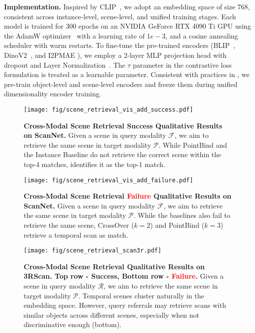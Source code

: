\noindent \textbf{Implementation.} Inspired by CLIP~\cite{Radford2021LearningTV}, we adopt an embedding space of size $768$, consistent across instance-level, scene-level, and unified training stages. Each model is trained for 300 epochs on an NVIDIA GeForce RTX 4090 Ti GPU using the AdamW optimizer~\cite{Loshchilov2017DecoupledWD} with a learning rate of $1e-3$, and a cosine annealing scheduler with warm restarts. To fine-tune the pre-trained encoders (BLIP~\cite{Li2022BLIPBL}, DinoV2~\cite{oquab2023dinov2, darcet2023vitneedreg}, and I2PMAE \cite{Zhang2022Learning3R}), we employ a 2-layer MLP projection head with dropout and Layer Normalization~\cite{miao2024scenegraphloc, girdhar2023imagebind}. The $\tau$ parameter in the contrastive loss formulation is treated as a learnable parameter. Consistent with practices in \cite{jia2024sceneverse}, we pre-train object-level and scene-level encoders and freeze them during unified dimensionality encoder training. 

\begin{figure*}
    \centering
    \texttt{[image: fig/scene\_retrieval\_vis\_add\_success.pdf]}
    \caption{\textbf{Cross-Modal Scene Retrieval \textcolor{spidergreen}{Success} Qualitative Results on ScanNet.} Given a scene in query modality $\mathcal{F}$, we aim to retrieve the same scene in target modality $\mathcal{P}$. While PointBind and the Instance Baseline do not retrieve the correct scene within the top-4 matches, \project{} identifies it as the top-1 match.}
    \label{fig:visual_comparison_add_success}
    \vspace{-5pt}
\end{figure*}  

\begin{figure*}
    \centering
    \texttt{[image: fig/scene\_retrieval\_vis\_add\_failure.pdf]}
    \caption{\textbf{Cross-Modal Scene Retrieval \textcolor{red}{Failure} Qualitative Results on ScanNet.} Given a scene in query modality $\mathcal{F}$, we aim to retrieve the same scene in target modality $\mathcal{P}$. While the baselines also fail to retrieve the same scene, CrossOver ($k=2$) and PointBind ($k=3$) retrieve a temporal scan as match.}
    \label{fig:visual_comparison_add_failure}
    \vspace{-5pt}
\end{figure*} 

\begin{figure*}
    \centering
    \texttt{[image: fig/scene\_retrieval\_scan3r.pdf]}
    \caption{\textbf{Cross-Modal Scene Retrieval Qualitative Results on 3RScan. Top row - \textcolor{spidergreen}{Success}, Bottom row - \textcolor{red}{Failure}.} Given a scene in query modality $\mathcal{R}$, we aim to retrieve the same scene in target modality $\mathcal{P}$. Temporal scenes cluster naturally in the embedding space. However, query referrals may retrieve scans with similar objects across different scenes, especially when not discriminative enough (bottom).}
    \label{fig:visual_comparison_scan3r}
    \vspace{-5pt}
\end{figure*}